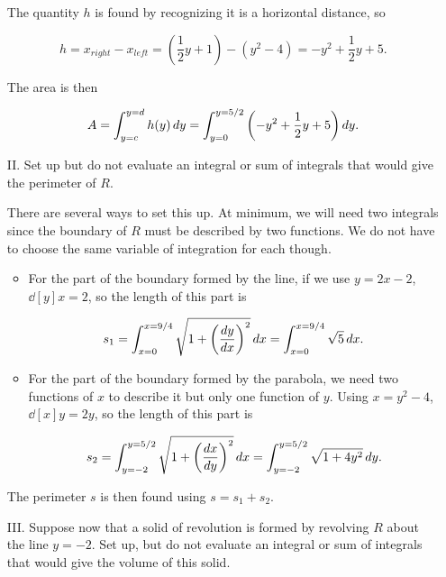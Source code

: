 \documentclass[]{ximera}
\begin{document}
\begin{problem}
\begin{enumerate}
\begin{freeResponse}
\begin{center}
{}
\end{center}

The quantity $h$ is found by recognizing it is a horizontal distance, so 

\[h=x_{right}-x_{left} = \left(\frac{1}{2}y+1\right)-(y^2-4) = -y^2+\frac{1}{2}y+5.\]

The area is then

\[
A = \int_{y=c}^{y=d} h(y) \d y = \int_{y=0}^{y=5/2} \left(-y^2+\frac{1}{2}y+5 \right) \d y.
\]
\end{freeResponse}

\item[II.] Set up but do not evaluate  an integral or sum of integrals that would give the perimeter of $R$. 

\begin{freeResponse}
There are several ways to set this up.  At minimum, we will need two integrals since the boundary of $R$ must be described by two functions.  We do not have to choose the same variable of integration for each though.

\begin{itemize}
\item For the part of the boundary formed by the line, if we use $y=2x-2$, $\dd[y]x = 2$, so the length of this part is 

\[
s_1 = \int_{x=0}^{x=9/4} \sqrt{1+\left(\dd[y]x\right)^2 } \d x =  \int_{x=0}^{x=9/4} \sqrt{5} \d x .
\]

\item For the part of the boundary formed by the parabola, we need two functions of $x$ to describe it but only one function of $y$.  Using $x=y^2-4$, $\dd[x]y = 2y$, so the length of this part is 

\[
s_2 = \int_{y=-2}^{y=5/2} \sqrt{1+\left(\dd[x]y\right)^2 } \d x =  \int_{y=-2}^{y=5/2} \sqrt{1+4y^2} \d y. 
\]

\end{itemize}

The perimeter $s$ is then found using $s = s_1+s_2$.


\end{freeResponse} 

\item[III.] Suppose now that a solid of revolution is formed by revolving $R$ about the line $y=-2$.  Set up, but do not evaluate an integral or sum of integrals that would give the volume of this solid.
\end{enumerate}

\end{problem}
\end{document}
